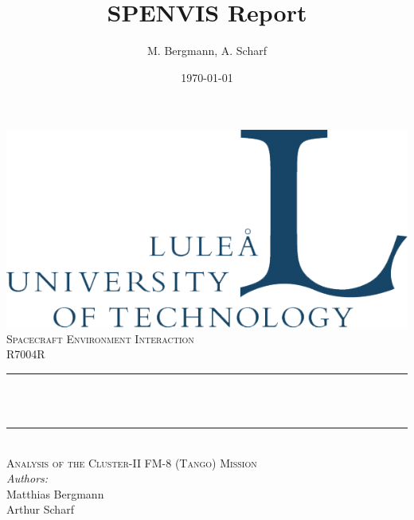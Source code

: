 \documentclass[12pt]{article}
\title{SPENVIS Report}
\author{M. Bergmann, A. Scharf}
\date{\today}
\makeatletter
\let\thetitle\@title
\let\thedate\@date
\makeatother
\begin{document}

\begin{titlepage}
	\centering
    \vspace*{0.5 cm}
    \includegraphics[scale = 0.4]{images/lulea}\\[1.0 cm]

   	\vspace{2cm}
	\textsc{\Large Spacecraft Environment Interaction}\\[0.5 cm]

	\textsc{\large R7004R}\\[0.5 cm]	
	\rule{\linewidth}{0.2 mm} \\[0.4 cm]
	{ \huge \bfseries \thetitle}\\
	\rule{\linewidth}{0.2 mm}
	\\[0.5cm]
		\textsc{Analysis of the Cluster-II FM-8 (Tango) Mission}
		\\[2.5 cm]

	
	\emph{Authors:}\\
	Matthias Bergmann \\
	Arthur Scharf

	\vspace{2cm}
	
	{\large \thedate}\\[2 cm]
 
	\vfill
	
\end{titlepage}







\pagebreak

\tableofcontents
\thispagestyle{empty}
\addtocounter{page}{-1}
\pagebreak








\newpage
{}
{}



\newpage
{}
{}


\end{document}
